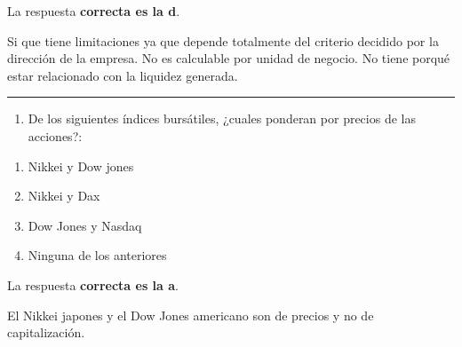 \documentclass[
  letterpaper,
  DIV=11,
  numbers=noendperiod]{scrreprt}
\providecommand{\tightlist}{%
  \setlength{\itemsep}{0pt}\setlength{\parskip}{0pt}}\usepackage{longtable,booktabs,array}
\begin{document}
\begin{tcolorbox}[enhanced jigsaw, left=2mm, opacityback=0, colback=white, breakable, arc=.35mm, bottomrule=.15mm, rightrule=.15mm, toprule=.15mm, leftrule=.75mm, colframe=quarto-callout-tip-color-frame]
\begin{minipage}[t]{5.5mm}
\textcolor{quarto-callout-tip-color}{\faLightbulb}
\end{minipage}%
\begin{minipage}[t]{\textwidth - 5.5mm}

La respuesta \textbf{correcta es la d}.

Si que tiene limitaciones ya que depende totalmente del criterio
decidido por la dirección de la empresa. No es calculable por unidad de
negocio. No tiene porqué estar relacionado con la liquidez generada.

\end{minipage}%
\end{tcolorbox}

\begin{center}\rule{0.5\linewidth}{0.5pt}\end{center}

\begin{enumerate}
\def\labelenumi{\arabic{enumi}.}
\setcounter{enumi}{45}
\tightlist
\item
  De los siguientes índices bursátiles, ¿cuales ponderan por precios de
  las acciones?:
\end{enumerate}

\begin{enumerate}
\def\labelenumi{\alph{enumi})}
\item
  Nikkei y Dow jones
\item
  Nikkei y Dax
\item
  Dow Jones y Nasdaq
\item
  Ninguna de los anteriores
\end{enumerate}

\begin{tcolorbox}[enhanced jigsaw, left=2mm, opacityback=0, colback=white, breakable, arc=.35mm, bottomrule=.15mm, rightrule=.15mm, toprule=.15mm, leftrule=.75mm, colframe=quarto-callout-tip-color-frame]
\begin{minipage}[t]{5.5mm}
\textcolor{quarto-callout-tip-color}{\faLightbulb}
\end{minipage}%
\begin{minipage}[t]{\textwidth - 5.5mm}

La respuesta \textbf{correcta es la a}.

El Nikkei japones y el Dow Jones americano son de precios y no de
capitalización.

\end{minipage}%
\end{tcolorbox}
\end{document}
